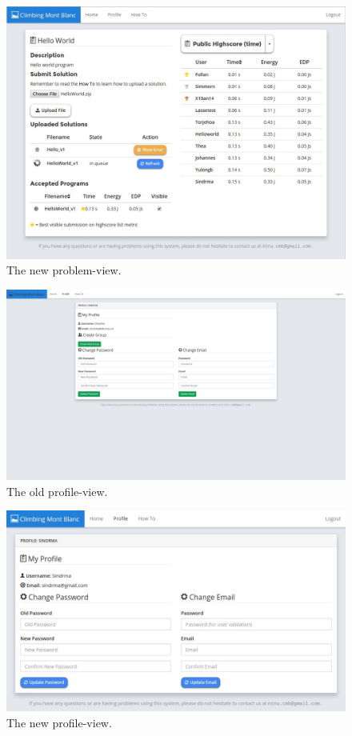 \begin{figure}[h!]
    \centering
    \includegraphics[width=1.0\textwidth]{screenshots/problem.jpg}
    \caption[]{The new problem-view.}
    \label{fig:apdx-new-problem}
\end{figure}

\begin{figure}[h!]
    \centering
    \includegraphics[width=1.0\textwidth]{oldscreenshots/profile.png}
    \caption[]{The old profile-view.}
    \label{fig:apdx-old-profile}
\end{figure}

\begin{figure}[h!]
    \centering
    \includegraphics[width=1.0\textwidth]{screenshots/profile.jpg}
    \caption[]{The new profile-view.}
    \label{fig:apdx-new.profile}
\end{figure}

